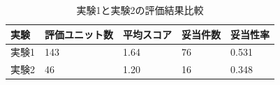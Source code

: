 \begin{table}[tbp]
\centering
\small
\caption{実験1と実験2の評価結果比較}
\label{tab:experiment\_comparison}
\begin{tabular}{lllll}
\toprule
実験 & 評価ユニット数 & 平均スコア & 妥当件数 & 妥当性率 \\
\midrule
実験1 & 143 & 1.64 & 76 & 0.531 \\
実験2 & 46 & 1.20 & 16 & 0.348 \\
\bottomrule
\end{tabular}
\end{table}
